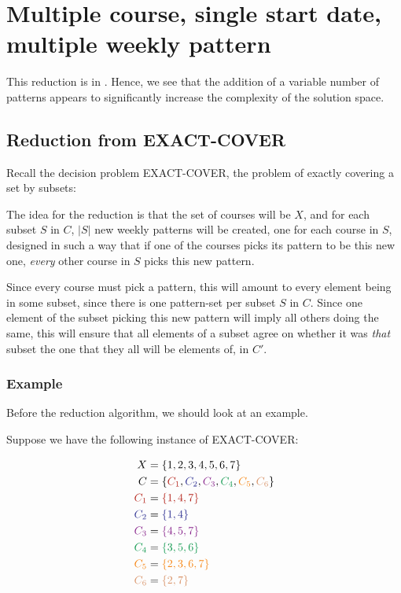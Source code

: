 \section{Multiple course, single start date, multiple weekly pattern}

This reduction is in \nph. Hence, we see that the addition of a variable number of patterns appears to significantly increase the complexity of the solution space.

\subsection{Reduction from EXACT-COVER}
Recall the decision problem EXACT-COVER, the problem of exactly covering a set by subsets:


The idea for the reduction is that the set of courses will be $X$, and for each subset $S$ in $C$, $|S|$ new weekly patterns will be created, one for each course in $S$, designed in such a way that if one of the courses picks its pattern to be this new one, \emph{every} other course in $S$ picks this new pattern.

Since every course must pick a pattern, this will amount to every element being in some subset, since there is one pattern-set per subset $S$ in $C$. Since one element of the subset picking this new pattern will imply all others doing the same, this will ensure that all elements of a subset agree on whether it was \emph{that} subset the one that they all will be elements of, in $C'$.

\subsubsection{Example}
Before the reduction algorithm, we should look at an example.

Suppose we have the following instance of EXACT-COVER:

\begin{align*}
X &= \{1, 2, 3, 4, 5, 6, 7\}\\
C &= \{{\color{BrickRed}C_1}, {\color{Blue}C_2}, {\color{Fuchsia}C_3}, {\color{ForestGreen}C_4}, {\color{BurntOrange}C_5}, {\color{Tan}C_6}\}\\
{\color{BrickRed} C_1} &= {\color{BrickRed} \{1, 4, 7\}}\\
{\color{Blue} C_2} &= {\color{Blue}\{ 1, 4 \} }\\
{\color{Fuchsia} C_3} &= {\color{Fuchsia} \{ 4, 5, 7\} }\\
{\color{ForestGreen} C_4} &= {\color{ForestGreen} \{ 3, 5, 6\} }\\
{\color{BurntOrange} C_5} &= {\color{BurntOrange} \{ 2, 3, 6, 7 \}}\\
{\color{Tan} C_6} &= {\color{Tan} \{2, 7\}}
\end{align*}


